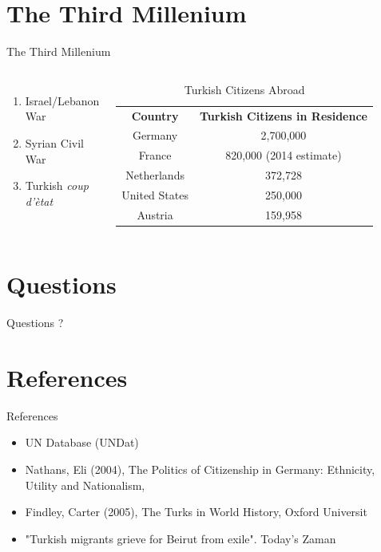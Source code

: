 \documentclass{beamer}
\begin{document}
\section{The Third Millenium}
\begin{frame}{The Third Millenium}
	\begin{columns}
			\begin{enumerate}
				\item Israel/Lebanon War
				\item Syrian Civil War
				\item Turkish \emph{coup d'\`{e}tat}
			\end{enumerate}
		
		\begin{table}[ht]
			\centering
			\begin{tabular}{|c|c|}
				\hline
				\bf{Country} & \bf{Turkish Citizens in Residence}\\
				\hhline
				Germany & 2,700,000\\
				\hline
				France & 820,000 (2014 estimate)\\
				\hline
				Netherlands & 372,728\\
				\hline
				United States & 250,000\\
				\hline
				Austria & 159,958\\
				\hline
			\end{tabular}
			\caption{Turkish Citizens Abroad}
		\end{table}
	\end{columns}
\end{frame}

\section*{Questions}
\begin{frame}{Questions}
\centering
\vcenter
	\Huge?
\end{frame}

\section*{References}
\begin{frame}{References}
	\begin{itemize}
		\item UN Database (UNDat)
		\item Nathans, Eli (2004), The Politics of Citizenship in Germany: Ethnicity, Utility and Nationalism, 
		\item Findley, Carter (2005), The Turks in World History, Oxford Universit
		\item  "Turkish migrants grieve for Beirut from exile". Today's Zaman
	\end{itemize}
	
\end{frame}
\end{document}

